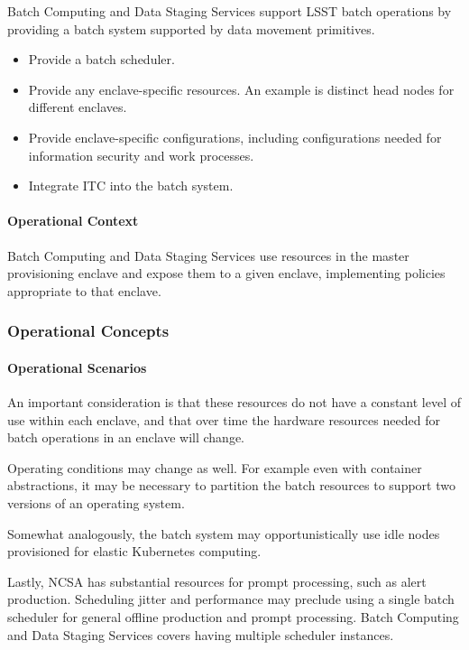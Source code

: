 Batch Computing and Data Staging Services support LSST batch
operations by providing a batch system supported by data movement primitives.

\begin{itemize}

\item Provide a batch scheduler.

\item Provide any enclave-specific resources. An example is distinct head
nodes for different enclaves.

\item Provide enclave-specific configurations, including configurations
needed for information security and work processes.

\item Integrate ITC into the batch system.

\end{itemize}

\paragraph{Operational Context}

Batch Computing and Data Staging Services use resources in the master provisioning
enclave and expose them to a given enclave, implementing policies appropriate to that enclave.

\subsubsection{Operational Concepts}

\paragraph{Operational Scenarios}

An important consideration is that these resources do not have a constant
level of use within each enclave, and that over time the hardware resources
needed for batch operations in an enclave will change.

Operating conditions may change as well. For example even with container
abstractions, it may be necessary to partition the batch resources to
support two versions of an operating system.

Somewhat analogously, the batch system may opportunistically use idle nodes provisioned
for elastic Kubernetes computing.

Lastly, NCSA has substantial resources for prompt processing, such as alert
production. Scheduling jitter and performance may preclude using a single batch
scheduler for general offline production and prompt processing. Batch Computing
and Data Staging Services covers having multiple scheduler instances.
